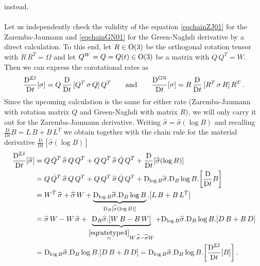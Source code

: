 \documentclass[10pt]{article}
\numberwithin{theoremCounter}{section}
\theoremstyle{plain}
\theoremstyle{definition}
\newcommand{\OO}{{\rm O}}
\newcommand{\DD}{\mathrm{D}}
\DeclareMathOperator{\ZJ}{ZJ}
\DeclareMathOperator{\GN}{GN}
\numberwithin{equation}{section}
\begin{document}
instead. \\
\\
Let us independently check the validity of the equation \eqref{eqchainZJ01} for the Zaremba-Jaumann and \eqref{eqchainGN01} for the Green-Naghdi derivative by a direct calculation. To this end, let $R \in \OO(3)$ be the orthogonal rotation tensor with $\dot{R} \, R^T = \Omega$ and let $Q^W = Q = Q(t) \in \OO(3)$ be a matrix with $\dot{Q} \, Q^T = W$. Then we can express the corotational rates as
	\begin{align}
	\frac{\DD^{\ZJ}}{\DD t}[\sigma] = Q \, \frac{\DD}{\DD t} \, [Q^T \, \sigma \, Q] \, Q^T \qquad \textnormal{and} \qquad \frac{\DD^{\GN}}{\DD t}[\sigma] = R \, \frac{\DD}{\DD t}\, [R^T \, \sigma \, R] \, R^T \, .
	\end{align}
Since the upcoming calculation is the same for either rate (Zaremba-Jaumann with rotation matrix $Q$ and Green-Naghdi with matrix $R$), we will only carry it out for the Zaremba-Jaumann derivative. Writing $\widehat \sigma = \widehat \sigma(\log B)$ and recalling $\frac{\DD}{\DD t} B = L \, B + B \, L^T$ we obtain together with the chain rule for the material derivative $\frac{\DD}{\DD t}[\widehat \sigma(\log B)]$
	\begin{equation}
	\label{thelasteq}
	\begin{alignedat}{2}
	\frac{\DD^{\ZJ}}{\DD t}[\widehat \sigma] &= Q \, \dot{Q}^T \, \widehat \sigma \, Q \, Q^T + Q \, Q^T \, \widehat \sigma \, \dot{Q} \, Q^T + \frac{\DD}{\DD t}[\widehat \sigma(\log B)] \\
	&= Q \, \dot{Q}^T \, \widehat \sigma \, Q \, Q^T + Q \, Q^T \, \widehat \sigma \, \dot{Q} \, Q^T + \DD_{\log B} \widehat \sigma . \DD_B \log B.\!\left[\frac{\DD}{\DD t} B\right] \\
	&= W^T \, \widehat \sigma + \widehat \sigma \, W + \underbrace{\DD_{\log B} \widehat \sigma . \DD_B \log B}_{\DD_B [\widehat \sigma(\log B)]}.[L \, B + B \, L^T] \\
	&= \widehat \sigma \, W - W \, \widehat \sigma + \underbrace{\DD_B \widehat \sigma.[W \, B - B \, W]}_{\overset{\eqref{eqratetype4}}{=} W \, \widehat \sigma - \widehat \sigma W} + \DD_{\log B} \widehat \sigma . \DD_B \log B.[D \, B + B \, D] \\
	&= \DD_{\log B} \widehat \sigma . \DD_B \log B.[D \, B + B \, D] = \DD_{\log B} \widehat \sigma . \DD_B \log B.\!\left[\frac{\DD^{\ZJ}}{\DD t}[B]\right].
	\end{alignedat}
	\end{equation}
%
\end{document}
